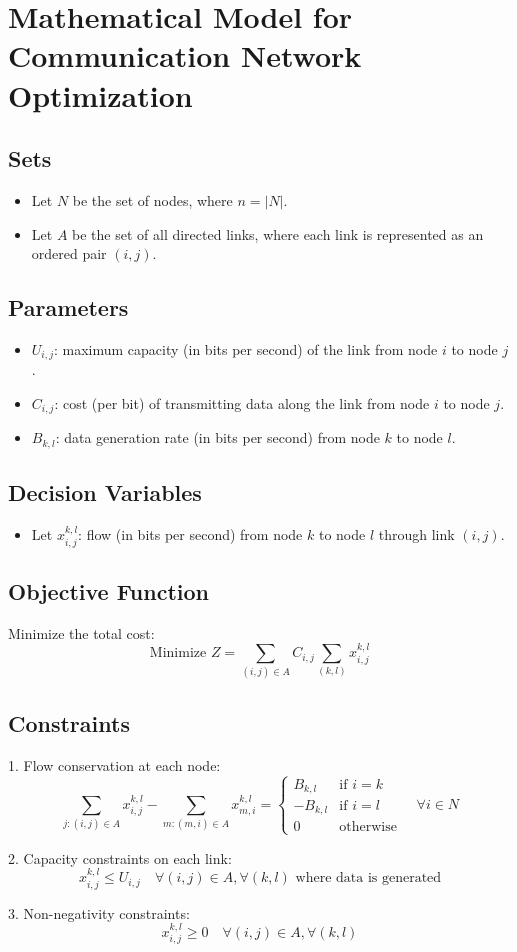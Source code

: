 \documentclass{article}
\begin{document}
\section*{Mathematical Model for Communication Network Optimization}

\subsection*{Sets}
\begin{itemize}
    \item Let \( N \) be the set of nodes, where \( n = |N| \).
    \item Let \( A \) be the set of all directed links, where each link is represented as an ordered pair \( (i,j) \).
\end{itemize}

\subsection*{Parameters}
\begin{itemize}
    \item \( U_{i,j} \): maximum capacity (in bits per second) of the link from node \( i \) to node \( j \).
    \item \( C_{i,j} \): cost (per bit) of transmitting data along the link from node \( i \) to node \( j \).
    \item \( B_{k,l} \): data generation rate (in bits per second) from node \( k \) to node \( l \).
\end{itemize}

\subsection*{Decision Variables}
\begin{itemize}
    \item Let \( x_{i,j}^{k,l} \): flow (in bits per second) from node \( k \) to node \( l \) through link \( (i,j) \).
\end{itemize}

\subsection*{Objective Function}
Minimize the total cost:
\[
\text{Minimize } Z = \sum_{(i,j) \in A} C_{i,j} \sum_{(k,l)} x_{i,j}^{k,l}
\]

\subsection*{Constraints}
1. Flow conservation at each node:
\[
\sum_{j: (i,j) \in A} x_{i,j}^{k,l} - \sum_{m: (m,i) \in A} x_{m,i}^{k,l} = 
\begin{cases} 
B_{k,l} & \text{if } i = k \\
-B_{k,l} & \text{if } i = l \\
0 & \text{otherwise}
\end{cases} \quad \forall i \in N
\]

2. Capacity constraints on each link:
\[
x_{i,j}^{k,l} \leq U_{i,j} \quad \forall (i,j) \in A, \forall (k,l) \text{ where data is generated}
\]

3. Non-negativity constraints:
\[
x_{i,j}^{k,l} \geq 0 \quad \forall (i,j) \in A, \forall (k,l)
\]
\end{document}
